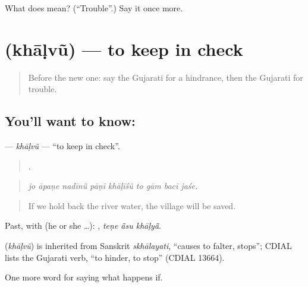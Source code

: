 \begin{tcolorbox}[breakable,colback=teal!4,colframe=teal!35!black,title={Before you move on}]
What does  mean? (\textquotedblleft{}Trouble\textquotedblright{}.) Say it once more.
\end{tcolorbox}
\section[\texorpdfstring{\gu{ખાળવું} (khāḷvũ)}{ખાળવું (khāḷvũ)}]{ (khāḷvũ) — to keep in check}

\label{lesson:GU-C374-khalvu}



\begin{quote}
Before the new one: say the Gujarati for a hindrance, then the Gujarati for trouble.
\end{quote}

\subsection*{You'll want to know: }
\textbf{} — \emph{khāḷvũ} — \textquotedblleft{}to keep in check\textquotedblright{}.

\begin{quote}
        .
\end{quote}

\begin{quote}
\emph{jo āpaṇe nadīnũ pāṇī khāḷīśũ to gām bacī jaśe.}
\end{quote}

\begin{quote}
If we hold back the river water, the village will be saved.
\end{quote}

Past, with  (he or she …):   , \emph{teṇe ā̃su khāḷyā̃}.

\begin{cousinweb}
\textbf{} (\emph{khāḷvũ}) is inherited from Sanskrit \emph{skhālayati}, \textquotedblleft{}causes to falter, stops\textquotedblright{}; CDIAL lists the Gujarati verb, \textquotedblleft{}to hinder, to stop\textquotedblright{} (CDIAL 13664).
\end{cousinweb}

\begin{grammarlens}[title={What you've built}]
One more word for saying what happens if.
\end{grammarlens}

